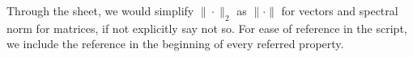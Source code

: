 \documentclass[11pt,landscape,a4paper]{article}
\newcommand{\HEADER}[1]{\begin{tcolorbox}
    \centering
    #1
\end{tcolorbox}}
\begin{document}
\small
\begin{multicols*}{4}

\HEADER{Through the sheet, we would simplify $\|\cdot\|_2$ as $\|\cdot\|$ for vectors and spectral norm for matrices, if not explicitly say not so. For ease of reference in the script, we include the reference in the beginning of every referred property.}





























\end{multicols*}
\end{document}

